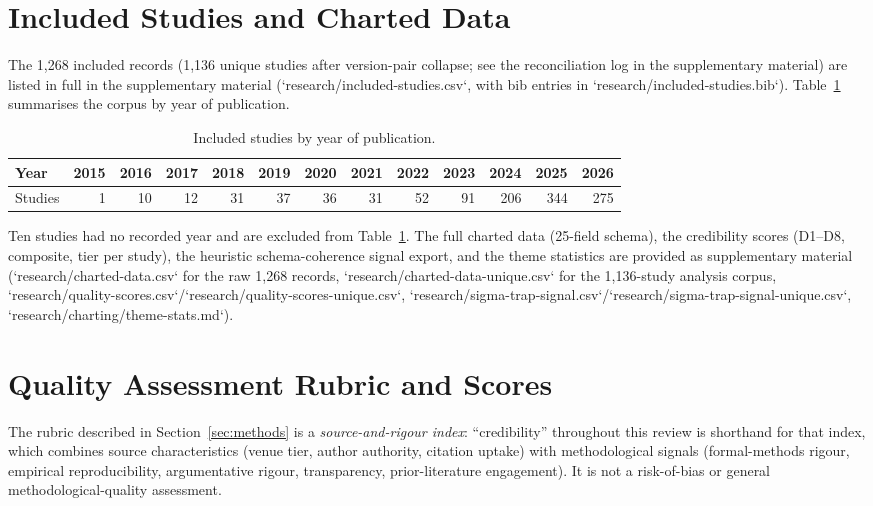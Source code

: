 \section{Included Studies and Charted Data}\label{app:studies}

The 1,268 included records (1,136 unique studies after version-pair collapse; see the reconciliation log in the supplementary material) are listed in full in the supplementary material (`research/included-studies.csv`, with bib entries in `research/included-studies.bib`). Table~\ref{tab:year} summarises the corpus by year of publication.

\begin{table}[htbp]
\centering
\caption{Included studies by year of publication.}
\label{tab:year}
\begin{tabular}{lrrrrrrrrrrrr}
\toprule
Year & 2015 & 2016 & 2017 & 2018 & 2019 & 2020 & 2021 & 2022 & 2023 & 2024 & 2025 & 2026 \\
\midrule
Studies & 1 & 10 & 12 & 31 & 37 & 36 & 31 & 52 & 91 & 206 & 344 & 275 \\
\bottomrule
\end{tabular}
\end{table}

Ten studies had no recorded year and are excluded from Table~\ref{tab:year}. The full charted data (25-field schema), the credibility scores (D1--D8, composite, tier per study), the heuristic schema-coherence signal export, and the theme statistics are provided as supplementary material (`research/charted-data.csv` for the raw 1,268 records, `research/charted-data-unique.csv` for the 1,136-study analysis corpus, `research/quality-scores.csv`/`research/quality-scores-unique.csv`, `research/sigma-trap-signal.csv`/`research/sigma-trap-signal-unique.csv`, `research/charting/theme-stats.md`).

\section{Quality Assessment Rubric and Scores}\label{app:quality}

The rubric described in Section~\ref{sec:methods} is a \emph{source-and-rigour index}: ``credibility'' throughout this review is shorthand for that index, which combines source characteristics (venue tier, author authority, citation uptake) with methodological signals (formal-methods rigour, empirical reproducibility, argumentative rigour, transparency, prior-literature engagement). It is not a risk-of-bias or general methodological-quality assessment.

